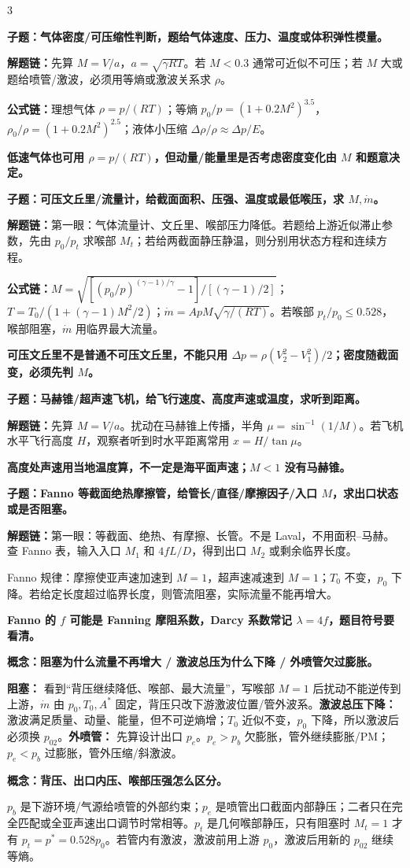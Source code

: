 \documentclass[a4paper]{article}
\newcommand{\qt}[1]{\vspace{0.10pt}\colorbox{Q}{\parbox{\dimexpr\linewidth-2\fboxsep}{\color{white}\bfseries #1}}\par}
\newcommand{\ans}[1]{\colorbox{G}{\parbox{\dimexpr\linewidth-2\fboxsep}{#1}}\par}
\newcommand{\warn}[1]{\colorbox{Y}{\parbox{\dimexpr\linewidth-2\fboxsep}{\color{E}\bfseries #1}}\par}
\newcommand{\chain}[1]{{\color{A}\bfseries 解题链：}#1\par}
\newcommand{\form}[1]{{\color{M}\bfseries 公式链：}#1\par}
\begin{document}
\begin{multicols}{3}
\qt{子题：气体密度/可压缩性判断，题给气体速度、压力、温度或体积弹性模量。}
\chain{先算 $M=V/a$，$a=\sqrt{\gamma RT}$。若 $M<0.3$ 通常可近似不可压；若 $M$ 大或题给喷管/激波，必须用等熵或激波关系求 $\rho$。}
\form{理想气体 $\rho=p/(RT)$；等熵 $p_0/p=(1+0.2M^2)^{3.5}$，$\rho_0/\rho=(1+0.2M^2)^{2.5}$；液体小压缩 $\Delta\rho/\rho\approx\Delta p/E$。}
\warn{低速气体也可用 $\rho=p/(RT)$，但动量/能量里是否考虑密度变化由 $M$ 和题意决定。}

\qt{子题：可压文丘里/流量计，给截面面积、压强、温度或最低喉压，求 $M,\dot m$。}
\chain{第一眼：气体流量计、文丘里、喉部压力降低。若题给上游近似滞止参数，先由 $p_0/p_t$ 求喉部 $M_t$；若给两截面静压静温，则分别用状态方程和连续方程。}
\form{$M=\sqrt{[(p_0/p)^{(\gamma-1)/\gamma}-1]/[(\gamma-1)/2]}$；$T=T_0/(1+(\gamma-1)M^2/2)$；$\dot m=ApM\sqrt{\gamma/(RT)}$。若喉部 $p_t/p_0\le0.528$，喉部阻塞，$\dot m$ 用临界最大流量。}
\warn{可压文丘里不是普通不可压文丘里，不能只用 $\Delta p=\rho(V_2^2-V_1^2)/2$；密度随截面变，必须先判 $M$。}

\qt{子题：马赫锥/超声速飞机，给飞行速度、高度声速或温度，求听到距离。}
\chain{先算 $M=V/a$。扰动在马赫锥上传播，半角 $\mu=\sin^{-1}(1/M)$。若飞机水平飞行高度 $H$，观察者听到时水平距离常用 $x=H/\tan\mu$。}
\warn{高度处声速用当地温度算，不一定是海平面声速；$M<1$ 没有马赫锥。}

\qt{子题：Fanno 等截面绝热摩擦管，给管长/直径/摩擦因子/入口 $M$，求出口状态或是否阻塞。}
\chain{第一眼：等截面、绝热、有摩擦、长管。不是 Laval，不用面积--马赫。查 Fanno 表，输入入口 $M_1$ 和 $4fL/D$，得到出口 $M_2$ 或剩余临界长度。}
\ans{Fanno 规律：摩擦使亚声速加速到 $M=1$，超声速减速到 $M=1$；$T_0$ 不变，$p_0$ 下降。若给定长度超过临界长度，则管流阻塞，实际流量不能再增大。}
\warn{Fanno 的 $f$ 可能是 Fanning 摩阻系数，Darcy 系数常记 $\lambda=4f$，题目符号要看清。}

\qt{概念：阻塞为什么流量不再增大 / 激波总压为什么下降 / 外喷管欠过膨胀。}
\ans{\textbf{阻塞：} 看到“背压继续降低、喉部、最大流量”，写喉部 $M=1$ 后扰动不能逆传到上游，$\dot m$ 由 $p_0,T_0,A^*$ 固定，背压只改下游激波位置/管外波系。\textbf{激波总压下降：} 激波满足质量、动量、能量，但不可逆熵增；$T_0$ 近似不变，$p_0$ 下降，所以激波后必须换 $p_{02}$。\textbf{外喷管：} 先算设计出口 $p_e$。$p_e>p_b$ 欠膨胀，管外继续膨胀/PM；$p_e<p_b$ 过膨胀，管外压缩/斜激波。}
\qt{概念：背压、出口内压、喉部压强怎么区分。}
\ans{$p_b$ 是下游环境/气源给喷管的外部约束；$p_e$ 是喷管出口截面内部静压；二者只在完全匹配或全亚声速出口调节时常相等。$p_t$ 是几何喉部静压，只有阻塞时 $M_t=1$ 才有 $p_t=p^*=0.528p_0$。若管内有激波，激波前用上游 $p_0$，激波后用新的 $p_{02}$ 继续等熵。}


\end{multicols}
\end{document}
